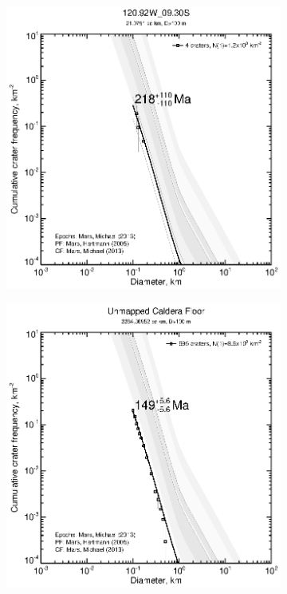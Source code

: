 \documentclass[12pt,letter]{article}
\begin{document}
\begin{figure}[h]
\begin{subfigure}{.33\textwidth}
\end{subfigure}
\begin{subfigure}{.33\textwidth}
  \includegraphics[width=\linewidth,clip,trim=1cm 1cm 1.5cm 1cm]{figures/craterstats/120-92W_09-30S_100m_cum.eps}
\end{subfigure}%
\begin{subfigure}{.33\textwidth}
  \includegraphics[width=\linewidth,clip,trim=1cm 1cm 1.5cm 1cm]{figures/craterstats/arsia_caldera_floor_100m_cum.eps}

\end{subfigure}
\end{figure}
\end{document}
